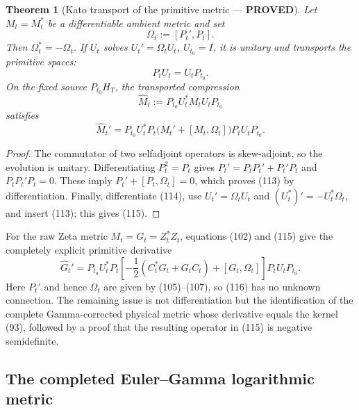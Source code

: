 \documentclass[11pt]{article}
\newtheorem{theorem}{Theorem}
\newcommand{\PROVED}{\textcolor{green!45!black}{\textbf{PROVED}}}
\begin{document}
\begin{theorem}[Kato transport of the primitive metric --- \PROVED]
Let $M_t=M_t^*$ be a differentiable ambient metric and set
\begin{equation}
 \Omega_t:=[P_t',P_t].                                 \tag{112}
\end{equation}
Then $\Omega_t^*=-\Omega_t$.  If $U_t$ solves
$U_t'=\Omega_tU_t$, $U_{t_0}=I$, it is unitary and transports the primitive
spaces:
\begin{equation}
 P_tU_t=U_tP_{t_0}.                                    \tag{113}
\end{equation}
On the fixed source $P_{t_0}H_T$, the transported compression
\begin{equation}
 \widehat M_t:=P_{t_0}U_t^*M_tU_tP_{t_0}              \tag{114}
\end{equation}
satisfies
\begin{equation}
 \widehat M_t'
 =P_{t_0}U_t^*P_t
   \bigl(M_t'+[M_t,\Omega_t]\bigr)
   P_tU_tP_{t_0}.                                      \tag{115}
\end{equation}
\end{theorem}

\begin{proof}
The commutator of two selfadjoint operators is skew-adjoint, so the evolution
is unitary.  Differentiating $P_t^2=P_t$ gives
$P_t'=P_tP_t'+P_t'P_t$ and $P_tP_t'P_t=0$.  These imply
$P_t'+[P_t,\Omega_t]=0$, which proves (113) by differentiation.  Finally,
differentiate (114), use $U_t'=\Omega_tU_t$ and
$(U_t^*)'=-U_t^*\Omega_t$, and insert (113); this gives (115).
\end{proof}

For the raw Zeta metric $M_t=G_t=Z_t^*Z_t$, equations (102) and (115) give
the completely explicit primitive derivative
\begin{equation}
 \widehat G_t'
 =P_{t_0}U_t^*P_t
 \left[-\frac12(C_t^*G_t+G_tC_t)+[G_t,\Omega_t]\right]
 P_tU_tP_{t_0}.                                       \tag{116}
\end{equation}
Here $P_t'$ and hence $\Omega_t$ are given by (105)--(107), so (116) has no
unknown connection.  The remaining issue is not differentiation but the
identification of the complete Gamma-corrected physical metric whose
derivative equals the kernel (93), followed by a proof that the resulting
operator in (115) is negative semidefinite.

\subsection{The completed Euler--Gamma logarithmic metric}
\end{document}
